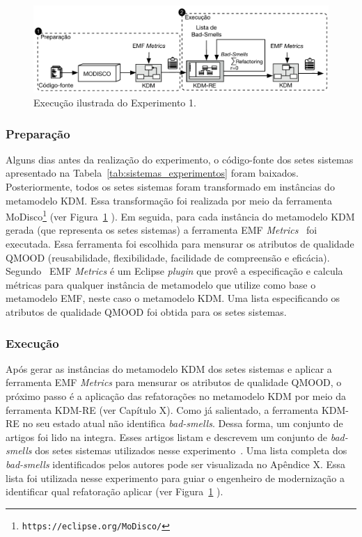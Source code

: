 \begin{figure}[h]
	\centering
	\caption{Execução ilustrada do Experimento 1.}
	\label{fig:execucao_experimento}
	\includegraphics[scale=0.9]{images/Figura_Experimento}
	\fautor
\end{figure}

\subsubsection{Preparação}

Alguns dias antes da realização do experimento, o código-fonte dos setes sistemas apresentado na Tabela~\ref{tab:sistemas_experimentos} foram baixados. Posteriormente, todos os setes sistemas foram transformado em instâncias do metamodelo KDM. Essa transformação foi realizada por meio da ferramenta MoDisco\footnote{\texttt{https://eclipse.org/MoDisco/}} (ver Figura~\ref{fig:execucao_experimento} ). Em seguida, para cada instância do metamodelo KDM gerada (que representa os setes sistemas) a ferramenta EMF \textit{Metrics}~\cite{Arendt_2012} foi executada. Essa ferramenta foi escolhida para mensurar os atributos de qualidade QMOOD (reusabilidade, flexibilidade, facilidade de compreensão e  eficácia). Segundo~ EMF \textit{Metrics} é um Eclipse \textit{plugin} que provê a especificação e calcula métricas para qualquer instância de metamodelo que utilize como base o metamodelo EMF, neste caso o metamodelo KDM. Uma lista especificando os atributos de qualidade QMOOD foi obtida para os setes sistemas.

\subsubsection{Execução}

Após gerar as instâncias do metamodelo KDM dos setes sistemas e aplicar a ferramenta EMF \textit{Metrics} para mensurar os atributos de qualidade QMOOD, o próximo passo é a aplicação das refatorações no metamodelo KDM por meio da ferramenta KDM-RE (ver Capítulo X). Como já salientado, a ferramenta KDM-RE no seu estado atual não identifica \textit{bad-smells}. Dessa forma, um conjunto de artigos foi lido na integra. Esses artigos listam e descrevem um conjunto de \textit{bad-smells} dos setes sistemas utilizados nesse experimento~\cite{Kessentini_2011, Ouni_2013, Moha_2010, Kessentini_2010}. Uma lista completa dos \textit{bad-smells} identificados pelos autores pode ser visualizada no Apêndice X. Essa lista foi utilizada nesse experimento para guiar o engenheiro de modernização a identificar qual refatoração aplicar (ver Figura~\ref{fig:execucao_experimento} ).

